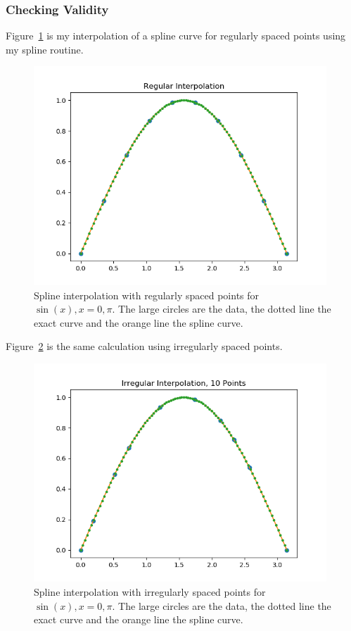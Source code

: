 \documentclass{scrartcl}
\begin{document}
\subsubsection{Checking Validity}
Figure~\ref{fig:regSpline} is my interpolation of a spline
curve for regularly spaced points using my spline routine.
\begin{figure}
\begin{center}
\includegraphics[width=11cm]{regSpline}
\end{center}
\caption{\label{fig:regSpline}Spline interpolation with regularly spaced
points for $\sin(x), x=0,\pi$. The large circles are the data, the dotted
line the exact curve and the orange line the spline curve.}
\end{figure}
Figure~\ref{fig:irregSpline} is the same calculation using irregularly
spaced points.
\begin{figure}
\begin{center}
\includegraphics[width=11cm]{irregSpline}
\end{center}
\caption{\label{fig:irregSpline}Spline interpolation with irregularly
spaced points for $\sin(x), x=0,\pi$. The large circles are the data,
the dotted line the exact curve and the orange line the spline curve.}
\end{figure}
\end{document}

